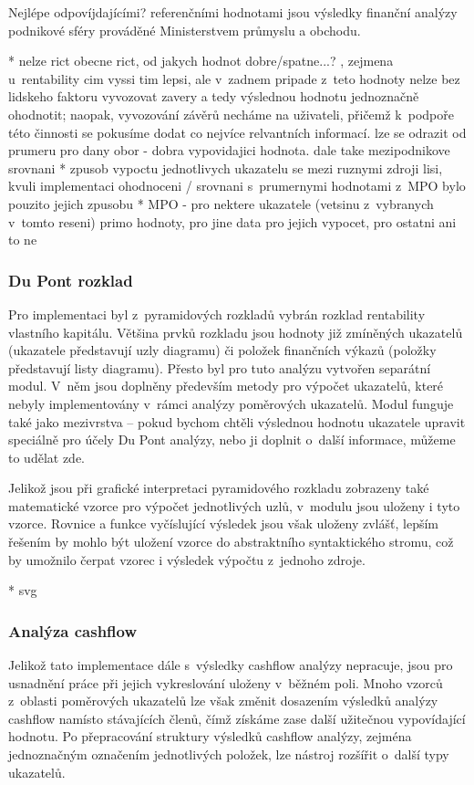Nejlépe odpovíjdajícími? referenčními hodnotami jsou výsledky finanční analýzy podnikové sféry prováděné Ministerstvem průmyslu a obchodu. 

* nelze rict obecne rict, od jakych hodnot dobre/spatne...? , zejmena u~rentability cim vyssi tim lepsi, ale v~zadnem pripade z~teto hodnoty nelze bez lidskeho faktoru vyvozovat zavery a tedy výslednou hodnotu jednoznačně ohodnotit; naopak, vyvozování závěrů necháme na uživateli, přičemž k~podpoře této činnosti se pokusíme dodat co nejvíce relvantních informací. lze se odrazit od prumeru pro dany obor - dobra vypovidajici hodnota. dale take mezipodnikove srovnani
* zpusob vypoctu jednotlivych ukazatelu se mezi ruznymi zdroji lisi, kvuli implementaci ohodnoceni / srovnani s~prumernymi hodnotami z~MPO bylo pouzito jejich zpusobu
* MPO - pro nektere ukazatele (vetsinu z~vybranych v~tomto reseni) primo hodnoty, pro jine data pro jejich vypocet, pro ostatni ani to ne


\subsubsection{Du Pont rozklad}
Pro implementaci byl z~pyramidových rozkladů vybrán rozklad rentability vlastního kapitálu. Většina prvků rozkladu jsou hodnoty již zmíněných ukazatelů (ukazatele představují uzly diagramu) či položek finančních výkazů (položky představují listy diagramu). Přesto byl pro tuto analýzu vytvořen separátní modul. V~něm jsou doplněny především metody pro výpočet ukazatelů, které nebyly implementovány v~rámci analýzy poměrových ukazatelů. Modul funguje také jako mezivrstva -- pokud bychom chtěli výslednou hodnotu ukazatele upravit speciálně pro účely Du Pont analýzy, nebo ji doplnit o~další informace, můžeme to udělat zde. 

Jelikož jsou při grafické interpretaci pyramidového rozkladu zobrazeny také matematické vzorce pro výpočet jednotlivých uzlů, v~modulu jsou uloženy i tyto vzorce. Rovnice a funkce vyčíslující výsledek jsou však uloženy zvlášť, lepším řešením by mohlo být uložení vzorce do abstraktního syntaktického stromu, což by umožnilo čerpat vzorec i výsledek výpočtu z~jednoho zdroje.

* svg

\subsubsection{Analýza cashflow}
Jelikož tato implementace dále s~výsledky cashflow analýzy nepracuje, jsou pro usnadnění práce při jejich vykreslování uloženy v~běžném poli. Mnoho vzorců z~oblasti poměrových ukazatelů lze však změnit dosazením výsledků analýzy cashflow namísto stávajících členů, čímž získáme zase další užitečnou vypovídající hodnotu. Po přepracování struktury výsledků cashflow analýzy, zejména jednoznačným označením jednotlivých položek, lze nástroj rozšířit o~další typy ukazatelů.

